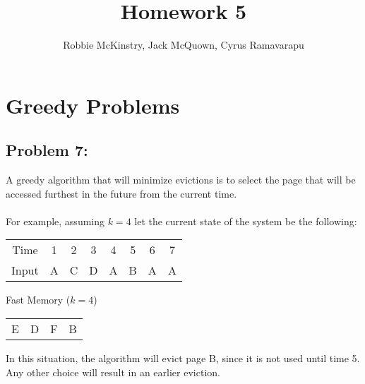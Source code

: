 \documentclass[12pt]{article}
\begin{document}
\title{Homework 5}
\author{Robbie McKinstry, Jack McQuown, Cyrus Ramavarapu}
\renewcommand{\today}{12 September 2016}
\renewcommand{\baselinestretch}{1.5}

\maketitle

\section*{Greedy Problems}
\subsection*{Problem 7:}
A greedy algorithm that will minimize evictions is to 
select the page that will be accessed furthest in the future
from the current time.\\\\
For example, assuming $k=4$ let the current state of the system be the
following:
\begin{center}
    \begin{tabular}{c|c|c|c|c|c|c|c}
    Time & 1 & 2 & 3 & 4 & 5 & 6 & 7 \\
    Input & A & C & D & A & B & A & A \\   
    \end{tabular}
    Fast Memory ($k=4$) 
    \begin{tabular}{c|c|c|c}
    E & D & F & B 
    \end{tabular}
\end{center}
In this situation, the algorithm will evict page B, since
it is not used until time 5.  Any other choice will result
in an earlier eviction. 
\end{document}
